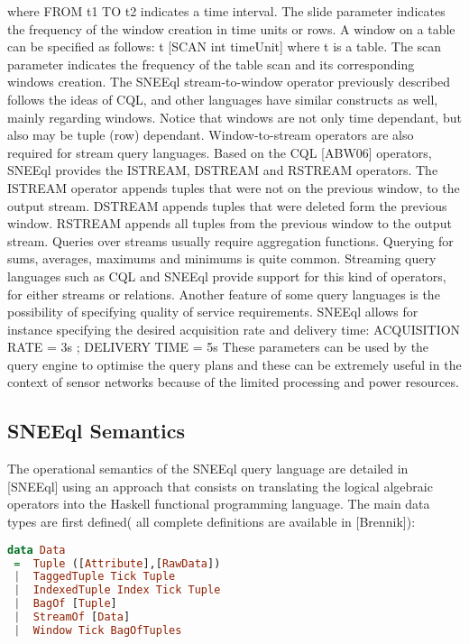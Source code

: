 where \textsf{FROM t1 TO t2} indicates a time interval. The slide parameter indicates the frequency of the window creation in time units or rows.
A window on a table can be specified as follows:
\textsf{t [SCAN int timeUnit]}
where t is a table. The scan parameter indicates the frequency of the table scan and its corresponding windows creation.
The SNEEql stream-to-window operator previously described follows the ideas of CQL, and other languages have similar constructs as well, mainly regarding windows. Notice that windows are not only time dependant, but also may be tuple (row) dependant.
Window-to-stream operators are also required for stream query languages. Based on the CQL [ABW06] operators, SNEEql provides the ISTREAM, DSTREAM and RSTREAM operators. The ISTREAM operator appends tuples that were not on the previous window, to the output stream. DSTREAM appends tuples that were deleted form the previous window. RSTREAM appends all tuples from the previous window to the output stream.
Queries over streams usually require aggregation functions. Querying for sums, averages, maximums and minimums is quite common. Streaming query languages such as CQL and SNEEql provide support for this kind of operators, for either streams or relations.
Another feature of some query languages is the possibility of specifying quality of service requirements. SNEEql allows for instance specifying the desired acquisition rate and delivery time:
\textsf{ACQUISITION RATE = 3s ; DELIVERY TIME = 5s}
These parameters can be used by the query engine to optimise the query plans and these can be extremely useful in the context of sensor networks because of the limited processing and power resources.


\subsection{SNEEql Semantics}
\label{sneeqlsemantics}

The operational semantics of the SNEEql query language are detailed in [SNEEql] using an approach that consists on translating the logical algebraic operators into the Haskell functional programming language. 
The main data types are first defined( all complete definitions are available in [Brennik]):


\begin{lstlisting}[style=HaskellSNEE,language=Haskell,frame=none]
data Data
 =	Tuple ([Attribute],[RawData])
 |	TaggedTuple Tick Tuple
 |	IndexedTuple Index Tick Tuple
 |	BagOf [Tuple]
 |	StreamOf [Data]
 |	Window Tick BagOfTuples
\end{lstlisting}

